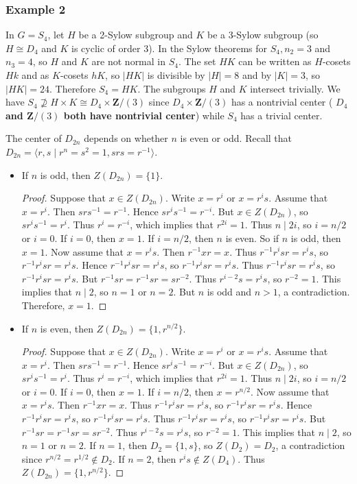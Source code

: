 \subsubsection{Example 2}

In $G=S_4$, let $H$ be a 2-Sylow subgroup and $K$ be a 3-Sylow subgroup (so $H \cong D_4$ and $K$ is cyclic of order 3). In the Sylow theorems for $S_4, n_2=3$ and $n_3=4$, so $H$ and $K$ are not normal in $S_4$. The set $H K$ can be written as $H$-cosets $H k$ and as $K$-cosets $h K$, so $|H K|$ is divisible by $|H|=8$ and by $|K|=3$, so $|H K|=24$. Therefore $S_4=H K$. The subgroups $H$ and $K$ intersect trivially. We have $S_4 \nsupseteq H \times K \cong D_4 \times \mathbf{Z} /(3)$ since $D_4 \times \mathbf{Z} /(3)$ has a nontrivial center ( \textbf{$D_4$ and $\mathbf{Z} /(3)$ both have nontrivial center}) while $S_4$ has a trivial center.

The center of $D_{2n}$ depends on whether $n$ is even or odd. Recall that $D_{2n}=\langle r,s \mid r^n=s^2=1, srs=r^{-1}\rangle$.

\begin{itemize}
	\item If $n$ is odd, then $Z(D_{2n}) = \{1\}$.
\begin{proof}
Suppose that $x \in Z(D_{2n})$. Write $x = r^i$ or $x = r^i s$. Assume that $x = r^i$. Then $srs^{-1} = r^{-1}$. Hence $sr^i s^{-1} = r^{-i}$. But $x \in Z(D_{2n})$, so $sr^i s^{-1} = r^i$. Thus $r^i = r^{-i}$, which implies that $r^{2i} = 1$. Thus $n \mid 2i$, so $i = n/2$ or $i = 0$. If $i = 0$, then $x = 1$. If $i = n/2$, then $n$ is even. So if $n$ is odd, then $x = 1$. Now assume that $x = r^i s$. Then $r^{-1}xr = x$. Thus $r^{-1} r^i s r = r^i s$, so $r^{-1} r^i s r = r^i s$. Hence $r^{-1} r^i s r = r^i s$, so $r^{-1} r^i s r = r^i s$. Thus $r^{-1} r^i s r = r^i s$, so $r^{-1} r^i s r = r^i s$. But $r^{-1} s r = r^{-1} s r = s r^{-2}$. Thus $r^{i-2} s = r^i s$, so $r^{-2} = 1$. This implies that $n \mid 2$, so $n = 1$ or $n = 2$. But $n$ is odd and $n > 1$, a contradiction. Therefore, $x = 1$.
\end{proof}
	\item If $n$ is even, then $Z(D_{2n}) = \{1, r^{n/2}\}$.
\begin{proof}
Suppose that $x \in Z(D_{2n})$. Write $x = r^i$ or $x = r^i s$. Assume that $x = r^i$. Then $srs^{-1} = r^{-1}$. Hence $sr^i s^{-1} = r^{-i}$. But $x \in Z(D_{2n})$, so $sr^i s^{-1} = r^i$. Thus $r^i = r^{-i}$, which implies that $r^{2i} = 1$. Thus $n \mid 2i$, so $i = n/2$ or $i = 0$. If $i = 0$, then $x = 1$. If $i = n/2$, then $x = r^{n/2}$. Now assume that $x = r^i s$. Then $r^{-1}xr = x$. Thus $r^{-1} r^i s r = r^i s$, so $r^{-1} r^i s r = r^i s$. Hence $r^{-1} r^i s r = r^i s$, so $r^{-1} r^i s r = r^i s$. Thus $r^{-1} r^i s r = r^i s$, so $r^{-1} r^i s r = r^i s$. But $r^{-1} s r = r^{-1} s r = s r^{-2}$. Thus $r^{i-2} s = r^i s$, so $r^{-2} = 1$. This implies that $n \mid 2$, so $n = 1$ or $n = 2$. If $n = 1$, then $D_2 = \{1, s\}$, so $Z(D_2) = D_2$, a contradiction since $r^{n/2} = r^{1/2} \notin D_2$. If $n = 2$, then $r^i s \notin Z(D_4)$. Thus $Z(D_{2n}) = \{1, r^{n/2}\}$.
\end{proof}
\end{itemize}

